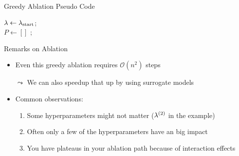 \begin{frame}[c,fragile]{Greedy Ablation Pseudo Code}

\LinesNotNumbered
\begin{algorithm}[H]
	\BlankLine
	$\mathbf{\lambda} \leftarrow  \mathbf{\lambda}_{\text{start}}$; \\
	$P \leftarrow [] $ ;\\ 
	\pause
	\pause
	\caption{Greedy Ablation}
	\end{algorithm}
	
\end{frame}
\begin{frame}[c,fragile]{Remarks on Ablation}

\begin{itemize}
	\item Even this greedy ablation requires $\mathcal{O}(n^2)$ steps 
	\pause
	\item[$\leadsto$] We can also speedup that up by using surrogate models\\
	\medskip
	\pause
	\item Common observations:
	\begin{enumerate}
		\item Some hyperparameters might not matter ($\mathbf{\lambda}^{(2)}$ in the example)
		\pause
		\item Often only a few of the hyperparameters have an big impact
		\pause
		\item You have plateaus in your ablation path because of interaction effects
	\end{enumerate}
\end{itemize}

\end{frame}



